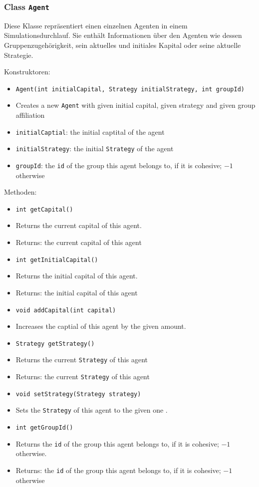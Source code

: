 \documentclass[parskip=full,11pt]{scrartcl}
\begin{document}
\subsubsection{Class \texttt{Agent}}
Diese Klasse repräsentiert einen einzelnen Agenten in einem Simulationsdurchlauf. Sie enthält Informationen über den Agenten wie dessen Gruppenzugehörigkeit, sein aktuelles und initiales Kapital oder seine aktuelle Strategie.

Konstruktoren:
\begin{itemize}\itemsep -10pt
\item \texttt{Agent(int initialCapital, Strategy initialStrategy, int groupId)}
\item[] Creates a new \texttt{Agent} with given initial capital, given strategy and given group affiliation
\item[] \texttt{initialCaptial}: the initial captital of the agent
\item[] \texttt{initialStrategy}: the initial \texttt{Strategy} of the agent
\item[] \texttt{groupId}: the \texttt{id} of the group this agent belongs to, if it is cohesive; \(-1\) otherwise
\end{itemize}

Methoden:
\begin{itemize}\itemsep -10pt
\item \texttt{int getCapital()}
\item[] Returns the current capital of this agent.
\item[] Returns: the current capital of this agent

\item \texttt{int getInitialCapital()}
\item[] Returns the initial capital of this agent.
\item[] Returns: the initial capital of this agent

\item \texttt{void addCapital(int capital)}
\item[] Increases the captial of this agent by the given amount.

\item \texttt{Strategy getStrategy()}
\item[] Returns the current \texttt{Strategy} of this agent
\item[] Returns: the current \texttt{Strategy} of this agent

\item\texttt{void setStrategy(Strategy strategy)}
\item[] Sets the \texttt{Strategy} of this agent to the given one	.

\item \texttt{int getGroupId()}
\item[] Returns the \texttt{id} of the group this agent belongs to, if it is cohesive; \(-1\) otherwise.
\item[] Returns: the \texttt{id} of the group this agent belongs to, if it is cohesive; \(-1\) otherwise
\end{itemize}
\end{document}
